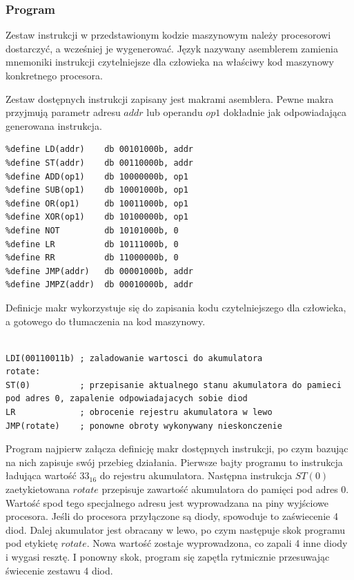 \documentclass[a4paper,12pt]{article}
\begin{document}
\subsubsection{Program}

Zestaw instrukcji w przedstawionym kodzie maszynowym należy procesorowi dostarczyć, a wcześniej je wygenerować. Język nazywany asemblerem zamienia mnemoniki instrukcji czytelniejsze dla człowieka na właściwy kod maszynowy konkretnego procesora.

Zestaw dostępnych instrukcji zapisany jest makrami asemblera. Pewne makra przyjmują parametr adresu $addr$ lub operandu $op1$ dokładnie jak odpowiadająca generowana instrukcja.
\begin{lstlisting}[label=Instrukcje,caption=Instructions.asm]
%define LDI(op1)    db 00000000b, op1
%define LD(addr)    db 00101000b, addr
%define ST(addr)    db 00110000b, addr
%define ADD(op1)    db 10000000b, op1
%define SUB(op1)    db 10001000b, op1
%define OR(op1)     db 10011000b, op1
%define XOR(op1)    db 10100000b, op1
%define NOT         db 10101000b, 0
%define LR          db 10111000b, 0
%define RR          db 11000000b, 0
%define JMP(addr)   db 00001000b, addr
%define JMPZ(addr)  db 00010000b, addr
\end{lstlisting}

Definicje makr wykorzystuje się do zapisania kodu czytelniejszego dla człowieka, a gotowego do tłumaczenia na kod maszynowy.

\begin{lstlisting}[label=Diods,caption=Diods.asm]
%include "instructions.asm"

LDI(00110011b) ; zaladowanie wartosci do akumulatora
rotate:
ST(0)          ; przepisanie aktualnego stanu akumulatora do pamieci pod adres 0, zapalenie odpowiadajacych sobie diod
LR             ; obrocenie rejestru akumulatora w lewo
JMP(rotate)    ; ponowne obroty wykonywany nieskonczenie
\end{lstlisting}
Program najpierw załącza definicję makr dostępnych instrukcji, po czym bazując na nich zapisuje swój przebieg działania. Pierwsze bajty programu to instrukcja ładująca wartość $33_{16}$ do rejestru akumulatora. Następna instrukcja $ST(0)$ zaetykietowana $rotate$ przepisuje zawartość akumulatora do pamięci pod adres $0$. Wartość spod tego specjalnego adresu jest wyprowadzana na piny wyjściowe procesora. Jeśli do procesora przyłączone są diody, spowoduje to zaświecenie 4 diod. Dalej akumulator jest obracany w lewo, po czym następuje skok programu pod etykietę $rotate$. Nowa wartość zostaje wyprowadzona, co zapali 4 inne diody i wygasi resztę. I ponowny skok, program się zapętla rytmicznie przesuwając świecenie zestawu 4 diod.
\end{document}
